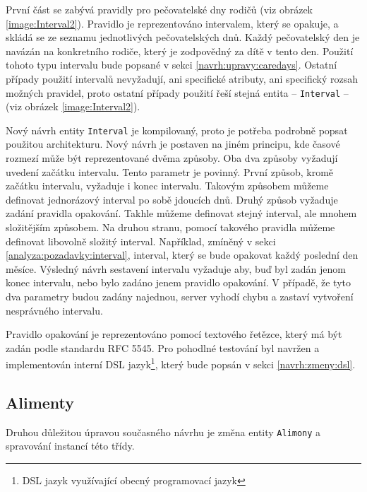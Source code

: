         První část se zabývá pravidly pro pečovatelské dny rodičů (viz obrázek \ref{image:Interval2}). Pravidlo je reprezentováno intervalem, který se opakuje, a skládá se ze seznamu jednotlivých pečovatelských dnů. Každý pečovatelský den je navázán na konkretního rodiče, který je zodpovědný za dítě v tento den. Použití tohoto typu intervalu bude popsané v sekci \ref{navrh:upravy:caredays}. Ostatní případy použití intervalů nevyžadují, ani specifické atributy, ani specifický rozsah možných pravidel, proto ostatní případy použití řeší stejná entita -- \verb|Interval| -- (viz obrázek \ref{image:Interval2}).
        
    
        Nový návrh entity \verb|Interval| je kompilovaný, proto je potřeba podrobně popsat použitou architekturu. Nový návrh je postaven na jiném principu, kde časové rozmezí může být reprezentované dvěma způsoby. Oba dva způsoby vyžadují uvedení začátku intervalu. Tento parametr je povinný. První způsob, kromě začátku intervalu, vyžaduje i konec intervalu. Takovým způsobem můžeme definovat jednorázový interval po sobě jdoucích dnů. Druhý způsob vyžaduje zadání pravidla opakování. Takhle můžeme definovat stejný interval, ale mnohem složitějším způsobem. Na druhou stranu, pomocí takového pravidla můžeme definovat libovolně složitý interval. 
        Například, zmíněný v sekci \ref{analyza:pozadavky:interval}, interval, který se bude opakovat každý poslední den měsíce. Výsledný návrh sestavení intervalu vyžaduje aby, buď byl zadán jenom konec intervalu, nebo bylo zadáno jenem pravidlo opakování. V případě, že tyto dva parametry budou zadány najednou, server vyhodí chybu a zastaví vytvoření nesprávného intervalu.
    
        Pravidlo opakování je reprezentováno pomocí textového řetězce, který má být zadán podle standardu {RFC 5545}\cite{recurrence-rule}. Pro pohodlné testování byl navržen a implementován {interní DSL jazyk}\footnote{DSL jazyk využívající obecný programovací jazyk}, který bude popsán v sekci \ref{navrh:zmeny:dsl}.
        
    \subsection{Alimenty}\label{navrh:upravy:alimenty}
        Druhou důležitou úpravou současného návrhu je změna entity \verb|Alimony| a spravování instancí této třídy.
    
